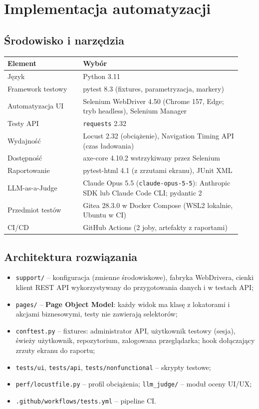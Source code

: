 \documentclass[11pt,a4paper]{article}
\begin{document}


\section{Implementacja automatyzacji}

\subsection{Środowisko i narzędzia}
\begin{longtable}{p{0.3\linewidth}p{0.63\linewidth}}
\toprule \textbf{Element} & \textbf{Wybór} \\ \midrule \endhead
Język & Python 3.11 \\
Framework testowy & pytest 8.3 (fixtures, parametryzacja, markery) \\
Automatyzacja UI & Selenium WebDriver 4.50 (Chrome 157, Edge; tryb headless), Selenium Manager \\
Testy API & \texttt{requests} 2.32 \\
Wydajność & Locust 2.32 (obciążenie), Navigation Timing API (czas ładowania) \\
Dostępność & axe-core 4.10.2 wstrzykiwany przez Selenium \\
Raportowanie & pytest-html 4.1 (z zrzutami ekranu), JUnit XML \\
LLM-as-a-Judge & Claude Opus 5.5 (\texttt{claude-opus-5-5}): Anthropic SDK lub Claude Code CLI; pydantic 2 \\
Przedmiot testów & Gitea 28.3.0 w Docker Compose (WSL2 lokalnie, Ubuntu w CI) \\
CI/CD & GitHub Actions (2 joby, artefakty z raportami) \\
\bottomrule
\end{longtable}

\subsection{Architektura rozwiązania}
\begin{itemize}
  \item \texttt{support/} -- konfiguracja (zmienne środowiskowe), fabryka WebDrivera,
        cienki klient REST API wykorzystywany do przygotowania danych i w testach API;
  \item \texttt{pages/} -- \textbf{Page Object Model}: każdy widok ma klasę z lokatorami
        i akcjami biznesowymi, testy nie zawierają selektorów;
  \item \texttt{conftest.py} -- fixtures: administrator API, użytkownik testowy (sesja),
        świeży użytkownik, repozytorium, zalogowana przeglądarka; hook dołączający zrzuty
        ekranu do raportu;
  \item \texttt{tests/ui}, \texttt{tests/api}, \texttt{tests/nonfunctional} -- skrypty testowe;
  \item \texttt{perf/locustfile.py} -- profil obciążenia; \texttt{llm\_judge/} -- moduł oceny UI/UX;
  \item \texttt{.github/workflows/tests.yml} -- pipeline CI.
\end{itemize}
\end{document}
